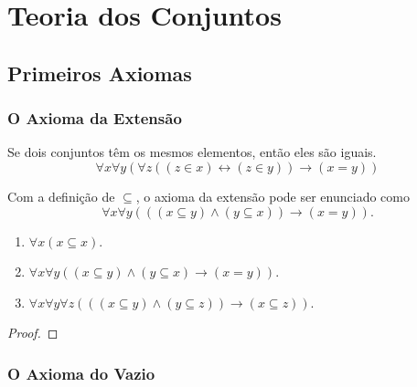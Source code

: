 
\chapter{Teoria dos Conjuntos}

\section{Primeiros Axiomas} \label{sec1}

\subsection{O Axioma da Extensão}

\begin{axiom}[da Extensão] \label{ax:1}
    Se dois conjuntos têm os mesmos elementos, então eles são iguais.
        \[
            \boxed{
                \forall x \forall y (\forall z((z \in x) \leftrightarrow (z \in y)) \rightarrow (x=y))
            }
        \]
\end{axiom}

\begin{remark}
    Com a definição de $\subseteq$, o axioma da extensão pode ser enunciado como
        \[
            \forall x \forall y (((x \subseteq y) \land (y \subseteq x)) \rightarrow (x=y)).
        \] 
\end{remark}

\begin{corollary}
    \leavevmode
        \begin{enumerate}[leftmargin=*, align=left, label=\textbf{(\alph*)}]
            \item $\forall x (x \subseteq x)$.
            \item $\forall x \forall y ((x \subseteq y) \land (y \subseteq x) \rightarrow (x=y))$.
            \item $\forall x \forall y \forall z (((x \subseteq y) \land (y \subseteq z)) \rightarrow (x \subseteq z))$.
        \end{enumerate}
\end{corollary}

\begin{proof}
    \blackproof
\end{proof}

\subsection{O Axioma do Vazio}


